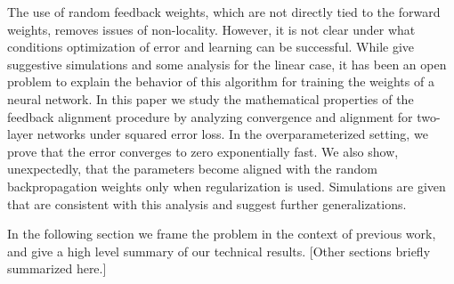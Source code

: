 The use of random feedback weights, which are not directly tied to the forward weights, removes issues of non-locality. However, it is not clear under what conditions optimization of error and learning can be successful. While \citet{lillicrap2016random} give suggestive simulations and some analysis for the linear case, it has been an open problem to explain the behavior of this algorithm for training the weights of a neural network.
In this paper we study the mathematical properties of the feedback alignment procedure by analyzing convergence and alignment for two-layer networks under squared error loss. In the overparameterized setting, we prove that the error converges to zero exponentially fast. We also show, unexpectedly, that the parameters become aligned with the random backpropagation weights only when regularization is used. Simulations are given that are consistent with this analysis and suggest further generalizations.

In the following section we frame the problem in the context of previous work, and give
a high level summary of our technical results. [Other sections briefly summarized here.]
